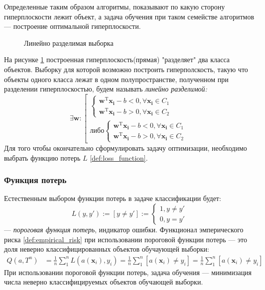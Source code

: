 \documentclass[%
bachelor,    %
subf,        %
href,        %
colorlinks,  %
]{disser}
\let\vec=\mathbf
\begin{document}
Определенные таким образом алгоритмы, показывают по какую сторону гиперплоскости лежит объект, а задача обучения при таком семействе алгоритмов --- построение оптимальной гиперплоскости.\\
\begin{figure}
	
	\caption{Линейно разделимая выборка}
	\label{fig:example1}
\end{figure}
На рисунке \ref{fig:example1} построенная гиперплоскость(прямая) "разделяет" два класса объектов. Выборку для которой возможно построить гиперполскость, такую что объекты одного класса лежат в одном полупространстве, полученном при разделении гиперплоскостью, будем называть \textit{линейно разделимой:}
\begin{equation*}
\exists \vec{w}:
\left[ 
\begin{gathered}
\begin{cases}
\vec{w}^\mathrm{T}\vec{x_i} - b < 0, \forall \vec{x_i} \in C_1
\\
\vec{w}^\mathrm{T}\vec{x_i} - b > 0, \forall \vec{x_i} \in C_2
\end{cases}\\
либо
\begin{cases}
\vec{w}^\mathrm{T}\vec{x_i} - b < 0, \forall \vec{x_i} \in C_1
\\
\vec{w}^\mathrm{T}\vec{x_i} - b > 0, \forall \vec{x_i} \in C_2
\end{cases}
\end{gathered}
\right.
\end{equation*}
Для того чтобы окончательно сформулировать задачу оптимизации, необходимо выбрать функцию потерь $L$ \eqref{def:loss_function}.

\subsubsection{Функция потерь}
Естественным выбором функции потерь в задаче классификации будет:
\begin{equation}\label{def:indicator_loss_function}
L(y,y'):=[y \neq y'] :=
\begin{cases}
1, y \neq y'
\\
0, y=y'
\end{cases} 
\end{equation}
--- \textit{пороговая функция потерь}, индикатор ошибки. 
Функционал эмперического риска \eqref{def:empirical_risk} при использовании пороговой функции потерь --- это доля неверно классифицированных объектов обучаующей выборки:
\begin{equation}
\begin{aligned}
Q(a,T^n) &= \frac{1}{n} \sum_{1}^{n}L(a(\vec{x}_i),y_i)
=\frac{1}{n} \sum_{1}^{n} [a(\vec{x}_i) \ne y_i] 
=\frac{1}{n} \sum_{1}^{n} [a(\vec{x}_i) \ne y_i]
\end{aligned}
\end{equation}
При использовании пороговой функции потерь, задача обучения --- минимизация числа неверно классифицируемых объектов обучающей выборки.
\end{document}
